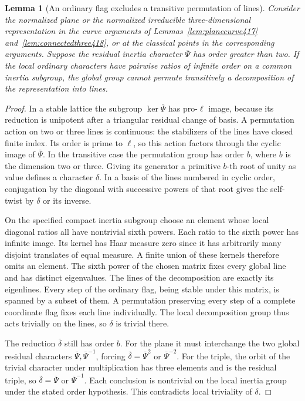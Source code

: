 \documentclass[a4paper,11pt]{article}
\newtheorem{lemma}[proposition]{Lemma}
\theoremstyle{definition}
\theoremstyle{remark}
\numberwithin{equation}{section}
\begin{document}
\begin{lemma}[An ordinary flag excludes a transitive permutation of lines]\leavevmode
\label{lem:monomialflag427}
Consider the normalized plane or the normalized irreducible
three-dimensional representation in the curve arguments of
Lemmas~\ref{lem:planecurve417} and~\ref{lem:connectedthree418},
or at the classical points in the corresponding arguments.
Suppose the residual inertia character \(\bar\Psi\) has order
greater than two. If the local ordinary characters have pairwise
ratios of infinite order on a common inertia subgroup, the
global group cannot permute transitively a decomposition of
the representation into lines.
\end{lemma}
\begin{proof}
In a stable lattice the subgroup \(\ker\bar\Psi\) has pro-\(\ell\)
image, because its reduction is unipotent after a triangular
residual change of basis. A permutation action on two or three
lines is continuous: the stabilizers of the lines have closed
finite index. Its order is prime to \(\ell\), so this action
factors through the cyclic image of \(\bar\Psi\). In the
transitive case the permutation group has order \(b\), where
\(b\) is the dimension two or three. Giving its generator a
primitive \(b\)-th root of unity as value defines a character
\(\delta\). In a basis of the lines numbered in cyclic order,
conjugation by the diagonal with successive powers of that
root gives the self-twist by \(\delta\) or its inverse.

On the specified compact inertia subgroup choose an element
whose local diagonal ratios all have nontrivial sixth powers.
Each ratio to the sixth power has infinite image. Its kernel
has Haar measure zero since it has arbitrarily many disjoint
translates of equal measure. A finite union of these kernels
therefore omits an element. The sixth power of the chosen
matrix fixes every global line and has distinct eigenvalues.
The lines of the decomposition are exactly its eigenlines.
Every step of the ordinary flag, being stable under this
matrix, is spanned by a subset of them. A permutation
preserving every step of a complete coordinate flag fixes
each line individually. The local decomposition group thus
acts trivially on the lines, so \(\delta\) is trivial there.

The reduction \(\bar\delta\) still has order \(b\).
For the plane it must interchange the two global residual
characters \(\bar\Psi,\bar\Psi^{-1}\), forcing
\(\bar\delta=\bar\Psi^{2}\) or \(\bar\Psi^{-2}\).
For the triple, the orbit of the trivial character under
multiplication has three elements and is the residual
triple, so \(\bar\delta=\bar\Psi\) or \(\bar\Psi^{-1}\).
Each conclusion is nontrivial on the local inertia group
under the stated order hypothesis. This contradicts local
triviality of \(\delta\).
\end{proof}
\end{document}
